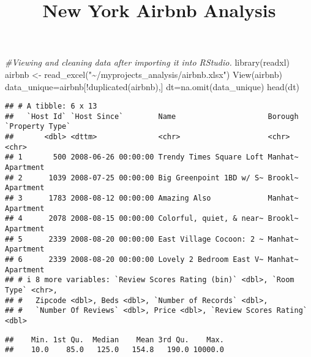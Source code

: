 \documentclass[
]{article}
\title{New York Airbnb Analysis}
\author{}
\date{\vspace{-2.5em}}
\newenvironment{Shaded}{\begin{snugshade}}{\end{snugshade}}
\newcommand{\CommentTok}[1]{\textcolor[rgb]{0.56,0.35,0.01}{\textit{#1}}}
\newcommand{\FunctionTok}[1]{\textcolor[rgb]{0.00,0.00,0.00}{#1}}
\newcommand{\NormalTok}[1]{#1}
\newcommand{\OtherTok}[1]{\textcolor[rgb]{0.56,0.35,0.01}{#1}}
\newcommand{\SpecialCharTok}[1]{\textcolor[rgb]{0.00,0.00,0.00}{#1}}
\newcommand{\StringTok}[1]{\textcolor[rgb]{0.31,0.60,0.02}{#1}}
\begin{document}
\maketitle

\begin{Shaded}
\begin{Highlighting}[]
\CommentTok{\#Viewing and cleaning data after importing it into RStudio.}
\FunctionTok{library}\NormalTok{(readxl)}
\NormalTok{airbnb }\OtherTok{\textless{}{-}} \FunctionTok{read\_excel}\NormalTok{(}\StringTok{"\textasciitilde{}/myprojects\_analysis/airbnb.xlsx"}\NormalTok{)}
\FunctionTok{View}\NormalTok{(airbnb)}
\NormalTok{data\_unique}\OtherTok{=}\NormalTok{airbnb[}\SpecialCharTok{!}\FunctionTok{duplicated}\NormalTok{(airbnb),]}
\NormalTok{dt}\OtherTok{=}\FunctionTok{na.omit}\NormalTok{(data\_unique)}
\FunctionTok{head}\NormalTok{(dt)}
\end{Highlighting}
\end{Shaded}

\begin{verbatim}
## # A tibble: 6 x 13
##   `Host Id` `Host Since`        Name                     Borough `Property Type`
##       <dbl> <dttm>              <chr>                    <chr>   <chr>          
## 1       500 2008-06-26 00:00:00 Trendy Times Square Loft Manhat~ Apartment      
## 2      1039 2008-07-25 00:00:00 Big Greenpoint 1BD w/ S~ Brookl~ Apartment      
## 3      1783 2008-08-12 00:00:00 Amazing Also             Manhat~ Apartment      
## 4      2078 2008-08-15 00:00:00 Colorful, quiet, & near~ Brookl~ Apartment      
## 5      2339 2008-08-20 00:00:00 East Village Cocoon: 2 ~ Manhat~ Apartment      
## 6      2339 2008-08-20 00:00:00 Lovely 2 Bedroom East V~ Manhat~ Apartment      
## # i 8 more variables: `Review Scores Rating (bin)` <dbl>, `Room Type` <chr>,
## #   Zipcode <dbl>, Beds <dbl>, `Number of Records` <dbl>,
## #   `Number Of Reviews` <dbl>, Price <dbl>, `Review Scores Rating` <dbl>
\end{verbatim}

\begin{Shaded}
\end{Shaded}

\begin{verbatim}
##    Min. 1st Qu.  Median    Mean 3rd Qu.    Max. 
##    10.0    85.0   125.0   154.8   190.0 10000.0
\end{verbatim}
\end{document}
